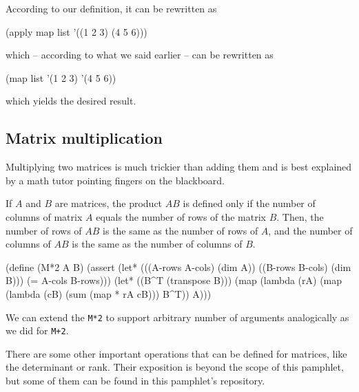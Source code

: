 According to our definition, it can be rewritten as

\begin{Snippet}
(apply map list '((1 2 3) (4 5 6)))
\end{Snippet}

which -- according to what we said earlier -- can
be rewritten as

\begin{Snippet}
(map list '(1 2 3) '(4 5 6))
\end{Snippet}

which yields the desired result.

\subsection{Matrix multiplication}

Multiplying two matrices is much trickier than adding
them and is best explained by a math tutor pointing
fingers on the blackboard.

If $A$ and $B$ are matrices, the product $AB$ is
defined only if the number of columns of matrix $A$
equals the number of rows of the matrix $B$. Then,
the number of rows of $AB$ is the same as the number
of rows of $A$, and the number of columns of $AB$
is the same as the number of columns of $B$.

\begin{Snippet}
(define (M*2 A B)
  (assert (let* (((A-rows A-cols) (dim A))
		((B-rows B-cols) (dim B)))
            (= A-cols B-rows)))
  (let* ((B^T (transpose B)))
    (map (lambda (rA)
	   (map (lambda (cB)
		  (sum (map * rA cB)))
		B^T))
	 A)))
\end{Snippet}

We can extend the \texttt{M*2} to support arbitrary
number of arguments analogically as we did for \texttt{M+2}.

There are some other important operations that can be defined
for matrices, like the determinant or rank. Their exposition
is beyond the scope of this pamphlet, but some of them can
be found in this pamphlet's repository.

